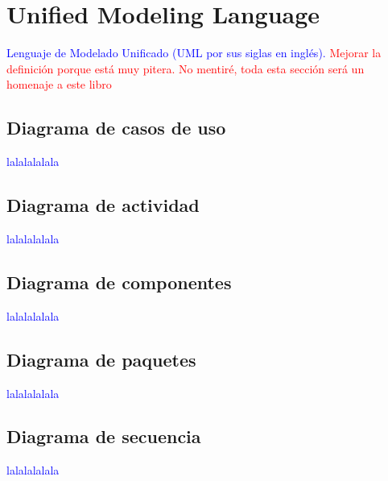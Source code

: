 \chapter{Unified Modeling Language}
\textcolor{blue}{Lenguaje de Modelado Unificado (UML por sus siglas en inglés).}
\textcolor{red}{Mejorar la definición porque está muy pitera.}
\textcolor{red}{No mentiré, toda esta sección será un homenaje a este libro \cite{SoftwareEngineeringUML}}
\section{Diagrama de casos de uso}\label{sec-uml-cu}
\textcolor{blue}{lalalalalala}
\section{Diagrama de actividad}\label{sec-uml-act}
\textcolor{blue}{lalalalalala}
\section{Diagrama de componentes}\label{sec-uml-comp}
\textcolor{blue}{lalalalalala}
\section{Diagrama de paquetes}\label{sec-uml-pack}
\textcolor{blue}{lalalalalala}
\section{Diagrama de secuencia}\label{sec-uml-seq}
\textcolor{blue}{lalalalalala}
